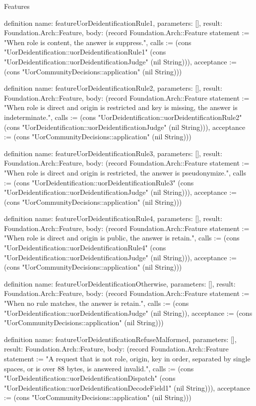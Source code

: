 \begin{lexlean}{Features}
\begin{semanticmodule}
definition{
  name: featureUorDeidentificationRule1,
  parameters: [],
  result: Foundation.Arch::Feature,
  body: (record Foundation.Arch::Feature {statement := "When role is content, the answer is suppress.", calls := (cons "UorDeidentification::uorDeidentificationRule1" (cons "UorDeidentification::uorDeidentificationJudge" (nil String))), acceptance := (cons "UorCommunityDecisions::application" (nil String))})
}

definition{
  name: featureUorDeidentificationRule2,
  parameters: [],
  result: Foundation.Arch::Feature,
  body: (record Foundation.Arch::Feature {statement := "When role is direct and origin is restricted and key is missing, the answer is indeterminate.", calls := (cons "UorDeidentification::uorDeidentificationRule2" (cons "UorDeidentification::uorDeidentificationJudge" (nil String))), acceptance := (cons "UorCommunityDecisions::application" (nil String))})
}

definition{
  name: featureUorDeidentificationRule3,
  parameters: [],
  result: Foundation.Arch::Feature,
  body: (record Foundation.Arch::Feature {statement := "When role is direct and origin is restricted, the answer is pseudonymize.", calls := (cons "UorDeidentification::uorDeidentificationRule3" (cons "UorDeidentification::uorDeidentificationJudge" (nil String))), acceptance := (cons "UorCommunityDecisions::application" (nil String))})
}

definition{
  name: featureUorDeidentificationRule4,
  parameters: [],
  result: Foundation.Arch::Feature,
  body: (record Foundation.Arch::Feature {statement := "When role is direct and origin is public, the answer is retain.", calls := (cons "UorDeidentification::uorDeidentificationRule4" (cons "UorDeidentification::uorDeidentificationJudge" (nil String))), acceptance := (cons "UorCommunityDecisions::application" (nil String))})
}

definition{
  name: featureUorDeidentificationOtherwise,
  parameters: [],
  result: Foundation.Arch::Feature,
  body: (record Foundation.Arch::Feature {statement := "When no rule matches, the answer is retain.", calls := (cons "UorDeidentification::uorDeidentificationJudge" (nil String)), acceptance := (cons "UorCommunityDecisions::application" (nil String))})
}

definition{
  name: featureUorDeidentificationRefuseMalformed,
  parameters: [],
  result: Foundation.Arch::Feature,
  body: (record Foundation.Arch::Feature {statement := "A request that is not role, origin, key in order, separated by single spaces, or is over 88 bytes, is answered invalid.", calls := (cons "UorDeidentification::uorDeidentificationDispatch" (cons "UorDeidentification::uorDeidentificationDecodeField1" (nil String))), acceptance := (cons "UorCommunityDecisions::application" (nil String))})
}


\end{semanticmodule}
\end{lexlean}
